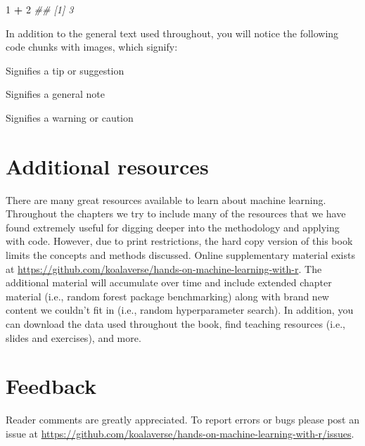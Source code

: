 \documentclass[]{krantz}
\makeatletter
\newenvironment{Shaded}{\begin{snugshade}}{\end{snugshade}}
\newcommand{\CommentTok}[1]{\textcolor[rgb]{0.37,0.37,0.37}{\textit{#1}}}
\newcommand{\DecValTok}[1]{\textcolor[rgb]{0.06,0.06,0.06}{#1}}
\newcommand{\OperatorTok}[1]{\textcolor[rgb]{0.43,0.43,0.43}{\textbf{#1}}}
\newcommand{\StringTok}[1]{\textcolor[rgb]{0.5,0.5,0.5}{#1}}
\newenvironment{kframe}{%
\medskip{}
\setlength{\fboxsep}{.8em}
 \def\at@end@of@kframe{}%
 \ifinner\ifhmode%
  \def\at@end@of@kframe{\end{minipage}}%
  \begin{minipage}{\columnwidth}%
 \fi\fi%
 \def\FrameCommand##1{\hskip\@totalleftmargin \hskip-\fboxsep
 \colorbox{shadecolor}{##1}\hskip-\fboxsep
     \hskip-\linewidth \hskip-\@totalleftmargin \hskip\columnwidth}%
 \MakeFramed {\advance\hsize-\width
   \@totalleftmargin\z@ \linewidth\hsize
   \@setminipage}}%
 {\par\unskip\endMakeFramed%
 \at@end@of@kframe}
\newenvironment{block}[1]
  {
  \begin{itemize}
  \renewcommand{\labelitemi}{
    \raisebox{-.7\height}[0pt][0pt]{
      {\setkeys{Gin}{width=3em,keepaspectratio}\texttt{[image: icons/\#1]}}
    }
  }
  \setlength{\fboxsep}{1em}
  \begin{kframe}
  \item
  }
  {
  \end{kframe}
  \end{itemize}
  }
\newenvironment{note}
  {\begin{block}{note}}
  {\end{block}}
\newenvironment{tip}
  {\begin{block}{tip}}
  {\end{block}}
\newenvironment{warning}
  {\begin{block}{warning}}
  {\end{block}}
\renewenvironment{Shaded}{\begin{kframe}}{\end{kframe}}
\makeatother
\begin{document}
\begin{Shaded}
\begin{Highlighting}[]
\DecValTok{1} \OperatorTok{+}\StringTok{ }\DecValTok{2}
\CommentTok{## [1] 3}
\end{Highlighting}
\end{Shaded}

In addition to the general text used throughout, you will notice the following code chunks with images, which signify:

\begin{tip}
Signifies a tip or suggestion
\end{tip}

\begin{note}
Signifies a general note
\end{note}

\begin{warning}
Signifies a warning or caution
\end{warning}

\hypertarget{additional-resources}{%
\section*{Additional resources}\label{additional-resources}}


There are many great resources available to learn about machine learning. Throughout the chapters we try to include many of the resources that we have found extremely useful for digging deeper into the methodology and applying with code. However, due to print restrictions, the hard copy version of this book limits the concepts and methods discussed. Online supplementary material exists at \url{https://github.com/koalaverse/hands-on-machine-learning-with-r}. The additional material will accumulate over time and include extended chapter material (i.e., random forest package benchmarking) along with brand new content we couldn't fit in (i.e., random hyperparameter search). In addition, you can download the data used throughout the book, find teaching resources (i.e., slides and exercises), and more.

\hypertarget{feedback}{%
\section*{Feedback}\label{feedback}}


Reader comments are greatly appreciated. To report errors or bugs please post an issue at \url{https://github.com/koalaverse/hands-on-machine-learning-with-r/issues}.
\end{document}
